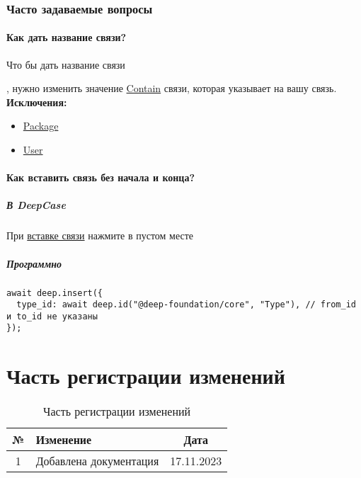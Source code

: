 \documentclass{article}
\begin{document}
\subsubsection{Часто задаваемые вопросы}
\paragraph{Как дать название связи?}
\hypertarget{FAQ.HowToSetName}{Что бы дать название связи}, нужно изменить значение \hyperlink{Contain.Def}{Contain} связи, которая указывает на вашу связь. \\
\textbf{Исключения:} 
\begin{itemize}
  \item \hyperlink{Package.Def}{Package}
  \item \hyperlink{Package.Def}{User}
\end{itemize}
\paragraph{Как вставить связь без начала и конца?}\hypertarget{FAQ.HowToInsertLinkWithoutFromAndTo}{}
\subparagraph{В DeepCase}
При \hyperlink{DeepCase.InsertLink.Def}{вставке связи} нажмите в пустом месте
\subparagraph{Программно}
\begin{verbatim}
await deep.insert({
  type_id: await deep.id("@deep-foundation/core", "Type"), // from_id и to_id не указаны
});
\end{verbatim}

\section{Часть регистрации изменений}

\begin{table}[h]
  \centering
  \caption{Часть регистрации изменений}
  \begin{tabular}{|c|p{8cm}|c|}
    \hline
    \textbf{№} & \textbf{Изменение}     & \textbf{Дата} \\
    \hline
    1          & Добавлена документация & 17.11.2023    \\
    \hline
  \end{tabular}
\end{table}
\end{document}

